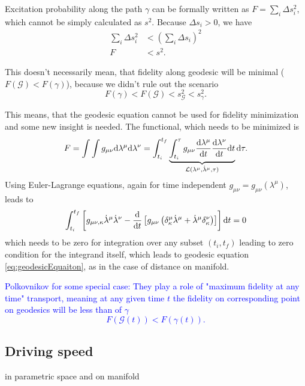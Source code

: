 Excitation probability along the path $\gamma$ can be formally written as $F=\sum_i\Delta s_i^2$, which cannot be simply calculated as $s^2$. Because $\Delta s_i>0$, we have
\begin{equation}
    \begin{split}
        \sum_i \Delta s_i^2& <(\sum_i\Delta s_i)^2\\
        F&<s^2.
    \end{split}
\end{equation}

This doesn't necessarily mean, that fidelity along geodesic will be minimal ($F(\mathcal{G})<F(\gamma)$), because we didn't rule out the scenario 
$$F(\gamma)<F(\mathcal{G})<s_\mathcal{G}^2<s_\gamma^2.$$

This means, that the geodesic equation cannot be used for fidelity minimization and some new insight is needed. The functional, which needs to be minimized is
\begin{equation}
    F=\int\int g_{\mu\nu}\mathrm{d}\lambda^\mu\mathrm{d}\lambda^\nu = \int_{t_i}^{t_f}\underbrace{\int_{t_i}^\tau g_{\mu\nu}\frac{\mathrm{d} \lambda^\mu}{\mathrm{d} t}\frac{\mathrm{d} \lambda^\nu}{\mathrm{d} t} \mathrm{d} t}_{\mathcal{L}(\lambda^\mu,\dot\lambda^\mu,\tau)}\mathrm{d} \tau .
\end{equation}
Using Euler-Lagrange equations, again for time independent $g_{\mu\nu}=g_{\mu\nu}(\lambda^\mu)$, leads to
\begin{equation}
    \int_{t_i}^{t_f}\left[g_{\mu\nu,\kappa}\dot\lambda^\mu\dot\lambda^\nu - \frac{\mathrm{d} }{\mathrm{d} t}\left[g_{\mu\nu}\left(\delta^\mu_\kappa\dot\lambda^\mu+\dot\lambda^\mu\delta^\nu_\kappa\right)\right]\right]\mathrm{d} t=0
\end{equation}
which needs to be zero for integration over any subset $(t_i,t_f)$ leading to zero condition for the integrand itself, which leads to geodesic equation \ref{eq:geodesicEquaiton}, as in the case of distance on manifold.



\textcolor{blue}{Polkovnikov for some special case: They play a role of "maximum fidelity at any time" transport, meaning at any given time $t$ the fidelity on corresponding point on geodesics will be less than of $\gamma$
$$F(\mathcal{G}(t))<F(\gamma(t)).$$ }



\subsection{Driving speed}
in parametric space and on manifold





